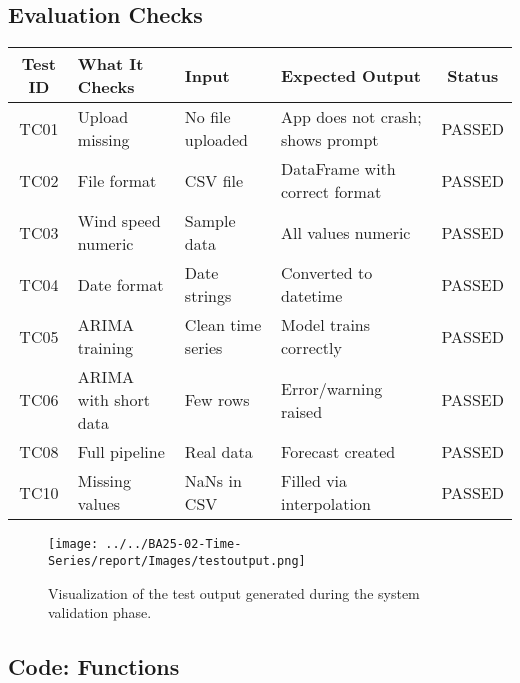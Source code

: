 \subsection{Evaluation Checks}
\begin{center}
	\renewcommand{\arraystretch}{1.1}
	\begin{tabular}{|c|p{4cm}|p{3.2cm}|p{4cm}|c|}
		\hline
		\textbf{Test ID} & \textbf{What It Checks} & \textbf{Input} & \textbf{Expected Output} & \textbf{Status} \\
		\hline
		TC01 & Upload missing & No file uploaded & App does not crash; shows prompt & \checkmark PASSED \\
		TC02 & File format & CSV file & DataFrame with correct format & \checkmark PASSED \\
		TC03 & Wind speed numeric & Sample data & All values numeric & \checkmark PASSED \\
		TC04 & Date format & Date strings & Converted to datetime & \checkmark PASSED \\
		TC05 & ARIMA training & Clean time series & Model trains correctly & \checkmark PASSED \\
		TC06 & ARIMA with short data & Few rows & Error/warning raised & \checkmark PASSED \\
		TC08 & Full pipeline & Real data & Forecast created & \checkmark PASSED \\
		TC10 & Missing values & NaNs in CSV & Filled via interpolation & \checkmark PASSED \\
		\hline
	\end{tabular}
\end{center}

\begin{figure}[H]
	\centering
	\texttt{[image: ../../BA25-02-Time-Series/report/Images/testoutput.png]}
	\caption[Visualization of Test Output Results]{
		Visualization of the test output generated during the system validation phase.
	}
	\label{fig:outputs}
\end{figure}

\subsection{Code: Functions}

